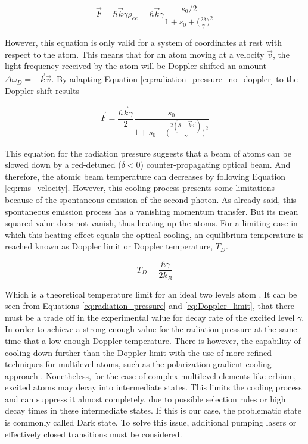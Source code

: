 \begin{equation}\label{eq:radiation_pressure_no_doppler}
	\vec{F} = \hbar \vec{k} \gamma \rho_{ee} = \hbar \vec{k} \gamma \frac{s_0/2}{1 + s_0 + \Big(\frac{2\delta}{\gamma}\Big)^2}
\end{equation}

However, this equation is only valid for a system of coordinates at rest with respect to the atom. This means that for an atom moving at a velocity $\vec{v}$, the light frequency received by the atom will be Doppler shifted an amount  $\Delta \omega_D = -\vec{k}\vec{v}$. By adapting Equation \eqref{eq:radiation_pressure_no_doppler} to the Doppler shift results

 \begin{equation}\label{eq:radiation_pressure}
 	\vec{F} = \frac{\hbar \vec{k} \gamma}{2} \frac{s_0}{1 + s_0 + \Big(\frac{2(\delta-\vec{k}\vec{v})}{\gamma}\Big)^2}
 \end{equation}

This equation for the radiation pressure suggests that a beam of atoms can be slowed down by a red-detuned ($\delta < 0$) counter-propagating optical beam. And therefore, the atomic beam temperature can decreases by following Equation \eqref{eq:rms_velocity}. However, this cooling process presents some limitations because of the spontaneous emission of the second photon. As already said, this spontaneous emission process has a vanishing momentum transfer. But its mean squared value does not vanish, thus heating up the atoms. For a limiting case in which this heating effect equals the optical cooling, an equilibrium temperature is reached known as Doppler limit or Doppler temperature, $T_D$.

\begin{equation}\label{eq:Doppler_limit}
	T_D = \frac{\hbar \gamma}{2 k_B}
\end{equation}

Which is a theoretical temperature limit for an ideal two levels atom \cite{Metcalf1999}. It can be seen from Equations \eqref{eq:radiation_pressure} and \eqref{eq:Doppler_limit}, that there must be a trade off in the experimental value for decay rate of the excited level $\gamma$. In order to achieve a strong enough value for the radiation pressure at the same time that a low enough Doppler temperature. There is however, the capability of cooling down further than the Doppler limit with the use of more refined techniques for multilevel atoms, such as the polarization gradient cooling approach \cite{Dalibard1989}. Nonetheless, for the case of complex multilevel elements like erbium, excited atoms may decay into intermediate states. This limits the cooling process and can suppress it almost completely, due to possible selection rules or high decay times in these intermediate states. If this is our case, the problematic state is commonly called Dark state. To solve this issue, additional pumping lasers or effectively closed transitions must be considered.

